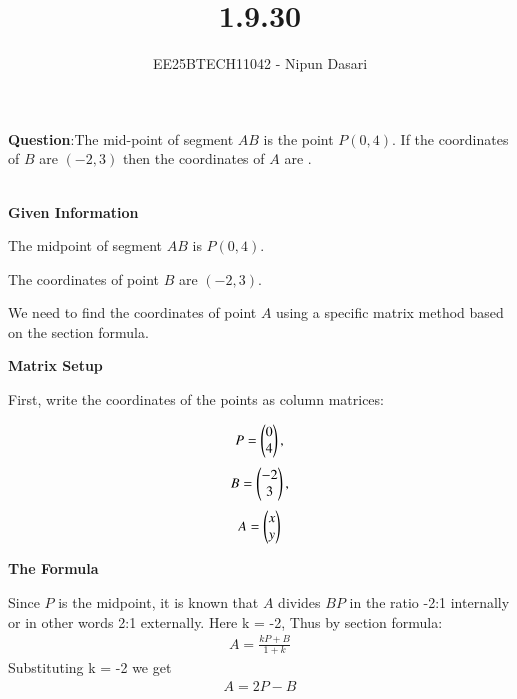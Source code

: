 \documentclass[journal]{IEEEtran}
\begin{document}
	
	
	\vspace{3cm}
	
	\title{1.9.30}
	\author{EE25BTECH11042 - Nipun Dasari}
	\maketitle
	{\let\newpage\relax\maketitle}
	
	\renewcommand{\thefigure}{\theenumi}
	\renewcommand{\thetable}{\theenumi}
	\setlength{\intextsep}{10pt} %
	
	
	\renewcommand{\thetable}{\theenumi}
	
	\textbf{Question}:The mid-point of segment $AB$ is the point $P(0,4)$. If the coordinates of $B$ are $(-2,3)$ then the coordinates of $A$ are \underline{\hspace{1.5cm}}. 

\solution\\\textbf{Given Information}  

The midpoint of segment $AB$ is $P(0,4)$.  

The coordinates of point $B$ are $(-2,3)$.  

We need to find the coordinates of point $A$ using a specific matrix method based on the section formula.  

\textbf{Matrix Setup}  

First, write the coordinates of the points as column matrices:  

\begin{align*}
    P = \myvec{0 \\ 4}, 
\end{align*}
\begin{align*}
    B = \myvec{-2 \\ 3}, 
\end{align*}
\begin{align*}
    A = \myvec{x \\ y}
\end{align*}



\textbf{The Formula}  

Since $P$ is the midpoint, it is known that $A$ divides $BP$ in the ratio -2:1 internally or in other words 2:1 externally.
Here k = -2, Thus by section formula:
\begin{align*}
A = \frac{kP+B}{1+k}
\end{align*}
Substituting k = -2 we get
\begin{align*}
    A = 2P - B
\end{align*}
\end{document}
